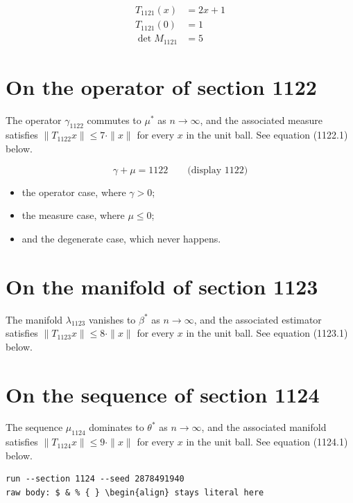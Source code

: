\documentclass{article}
\begin{document}
\begin{align}
T_{1121}(x) &= 2 x + 1 \\
T_{1121}(0) &= 1 \\
\det M_{1121} &= 5
\end{align}

\section{On the operator of section 1122}
The operator $\gamma_{1122}$ commutes to $\mu^{*}$ as $n \to \infty$,
and the associated measure satisfies $\|T_{1122} x\| \leq 7 \cdot \|x\|$
for every $x$ in the unit ball. See equation (1122.1) below.

$$
\gamma + \mu = 1122 \qquad \text{(display 1122)}
$$

\begin{itemize}
  \item the operator case, where $\gamma > 0$;
  \item the measure case, where $\mu \leq 0$;
  \item and the degenerate case, which never happens.
\end{itemize}

\section{On the manifold of section 1123}
The manifold $\lambda_{1123}$ vanishes to $\beta^{*}$ as $n \to \infty$,
and the associated estimator satisfies $\|T_{1123} x\| \leq 8 \cdot \|x\|$
for every $x$ in the unit ball. See equation (1123.1) below.

\section{On the sequence of section 1124}
The sequence $\mu_{1124}$ dominates to $\theta^{*}$ as $n \to \infty$,
and the associated manifold satisfies $\|T_{1124} x\| \leq 9 \cdot \|x\|$
for every $x$ in the unit ball. See equation (1124.1) below.

\begin{verbatim}
run --section 1124 --seed 2878491940
raw body: $ & % { } \begin{align} stays literal here
\end{verbatim}
\end{document}
